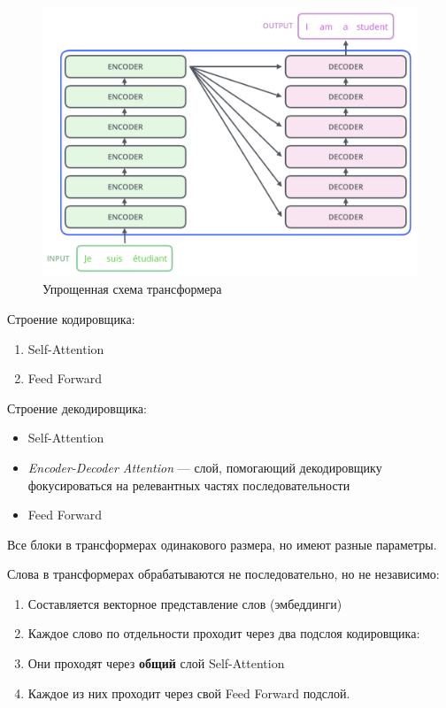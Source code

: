 \begin{figure}
    \centering
    \includegraphics[scale=0.4]{images/transformer-scheme.png}
    \caption{Упрощенная схема трансформера}
\end{figure}

Строение кодировщика:
\begin{enumerate}
    \item Self-Attention
    \item Feed Forward
\end{enumerate}

Строение декодировщика:
\begin{itemize}
    \item Self-Attention
    \item \textit{Encoder-Decoder Attention} --- слой, помогающий декодировщику фокусироваться на релевантных частях последовательности
    \item Feed Forward
\end{itemize}

\begin{remark}
    Все блоки в трансформерах одинакового размера, но имеют разные параметры.
\end{remark}

Слова в трансформерах обрабатываются не последовательно, но не независимо:
\begin{enumerate}
    \item Составляется векторное представление слов (эмбеддинги)
    \item Каждое слово по отдельности проходит через два подслоя кодировщика:
        \item Они проходят через \textbf{общий} слой Self-Attention
        \item Каждое из них проходит через свой Feed Forward подслой.
\end{enumerate}

